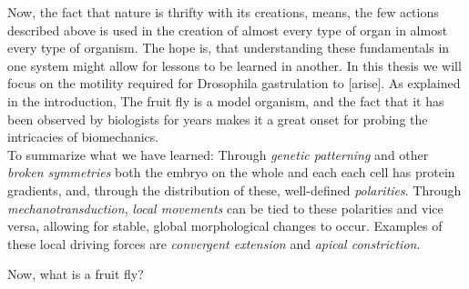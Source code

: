 
Now, the fact that nature is thrifty with its creations, means, the few actions described above is used in the creation of almost every type of organ in almost every type of organism. The hope is, that understanding these fundamentals in one system might allow for lessons to be learned in another. In this thesis we will focus on the motility required for Drosophila gastrulation to [arise]. As explained in the introduction, The fruit fly is a model organism, and the fact that it has been observed by biologists for years makes it a great onset for probing the intricacies of biomechanics.\\



To summarize what we have learned:
Through \textit{genetic patterning} and other \textit{broken symmetries} both the embryo on the whole and each each cell has protein gradients, and, through the distribution of these, well-defined \textit{polarities}.
Through \textit{mechanotransduction}, \textit{local movements} can be tied to these polarities and vice versa, allowing for stable, global morphological changes to occur. Examples of these local driving forces are \textit{convergent extension} and \textit{apical constriction}. 


Now, what is a fruit fly? 


